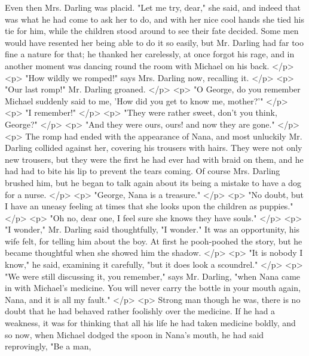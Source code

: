       Even then Mrs. Darling was placid. "Let me try, dear," she said, and
      indeed that was what he had come to ask her to do, and with her nice cool
      hands she tied his tie for him, while the children stood around to see
      their fate decided. Some men would have resented her being able to do it
      so easily, but Mr. Darling had far too fine a nature for that; he thanked
      her carelessly, at once forgot his rage, and in another moment was dancing
      round the room with Michael on his back.
    </p>
    <p>
      "How wildly we romped!" says Mrs. Darling now, recalling it.
    </p>
    <p>
      "Our last romp!" Mr. Darling groaned.
    </p>
    <p>
      "O George, do you remember Michael suddenly said to me, 'How did you get
      to know me, mother?'"
    </p>
    <p>
      "I remember!"
    </p>
    <p>
      "They were rather sweet, don't you think, George?"
    </p>
    <p>
      "And they were ours, ours! and now they are gone."
    </p>
    <p>
      The romp had ended with the appearance of Nana, and most unluckily Mr.
      Darling collided against her, covering his trousers with hairs. They were
      not only new trousers, but they were the first he had ever had with braid
      on them, and he had had to bite his lip to prevent the tears coming. Of
      course Mrs. Darling brushed him, but he began to talk again about its
      being a mistake to have a dog for a nurse.
    </p>
    <p>
      "George, Nana is a treasure."
    </p>
    <p>
      "No doubt, but I have an uneasy feeling at times that she looks upon the
      children as puppies."
    </p>
    <p>
      "Oh no, dear one, I feel sure she knows they have souls."
    </p>
    <p>
      "I wonder," Mr. Darling said thoughtfully, "I wonder." It was an
      opportunity, his wife felt, for telling him about the boy. At first he
      pooh-poohed the story, but he became thoughtful when she showed him the
      shadow.
    </p>
    <p>
      "It is nobody I know," he said, examining it carefully, "but it does look
      a scoundrel."
    </p>
    <p>
      "We were still discussing it, you remember," says Mr. Darling, "when Nana
      came in with Michael's medicine. You will never carry the bottle in your
      mouth again, Nana, and it is all my fault."
    </p>
    <p>
      Strong man though he was, there is no doubt that he had behaved rather
      foolishly over the medicine. If he had a weakness, it was for thinking
      that all his life he had taken medicine boldly, and so now, when Michael
      dodged the spoon in Nana's mouth, he had said reprovingly, "Be a man,
